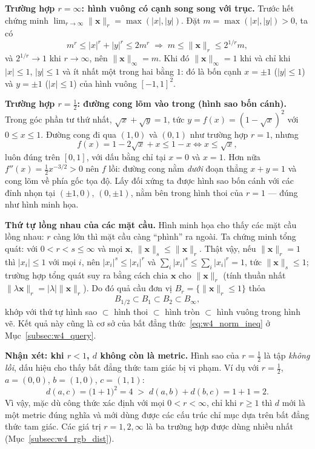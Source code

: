 \textbf{Trường hợp $r = \infty$: hình vuông có cạnh song song với trục.} Trước hết chứng minh $\lim_{r \to \infty} \|\mathbf{x}\|_r = \max(|x|, |y|)$. Đặt $m = \max(|x|, |y|) > 0$, ta có
\begin{equation}
m^r \le |x|^r + |y|^r \le 2 m^r \;\Longrightarrow\; m \le \|\mathbf{x}\|_r \le 2^{1/r} m,
\end{equation}
và $2^{1/r} \to 1$ khi $r \to \infty$, nên $\|\mathbf{x}\|_\infty = m$. Khi đó $\|\mathbf{x}\|_\infty = 1$ khi và chỉ khi $|x| \le 1$, $|y| \le 1$ và ít nhất một trong hai bằng $1$: đó là bốn cạnh $x = \pm 1$ ($|y| \le 1$) và $y = \pm 1$ ($|x| \le 1$) của hình vuông $[-1, 1]^2$.

\textbf{Trường hợp $r = \tfrac12$: đường cong lõm vào trong (hình sao bốn cánh).} Trong góc phần tư thứ nhất, $\sqrt{x} + \sqrt{y} = 1$, tức $y = f(x) = (1 - \sqrt{x})^2$ với $0 \le x \le 1$. Đường cong đi qua $(1, 0)$ và $(0, 1)$ như trường hợp $r = 1$, nhưng
\begin{equation}
f(x) = 1 - 2\sqrt{x} + x \le 1 - x \iff x \le \sqrt{x},
\end{equation}
luôn đúng trên $[0, 1]$, với dấu bằng chỉ tại $x = 0$ và $x = 1$. Hơn nữa $f''(x) = \tfrac{1}{2} x^{-3/2} > 0$ nên $f$ lồi: đường cong nằm \emph{dưới} đoạn thẳng $x + y = 1$ và cong lõm về phía gốc tọa độ. Lấy đối xứng ta được hình sao bốn cánh với các đỉnh nhọn tại $(\pm 1, 0)$, $(0, \pm 1)$, nằm bên trong hình thoi của $r = 1$ — đúng như hình minh họa.

\textbf{Thứ tự lồng nhau của các mặt cầu.} Hình minh họa cho thấy các mặt cầu lồng nhau: $r$ càng lớn thì mặt cầu càng ``phình'' ra ngoài. Ta chứng minh tổng quát: với $0 < r < s \le \infty$ và mọi $\mathbf{x}$, $\|\mathbf{x}\|_s \le \|\mathbf{x}\|_r$. Thật vậy, nếu $\|\mathbf{x}\|_r = 1$ thì $|x_i| \le 1$ với mọi $i$, nên $|x_i|^s \le |x_i|^r$ và $\sum_i |x_i|^s \le \sum_i |x_i|^r = 1$, tức $\|\mathbf{x}\|_s \le 1$; trường hợp tổng quát suy ra bằng cách chia $\mathbf{x}$ cho $\|\mathbf{x}\|_r$ (tính thuần nhất $\|\lambda \mathbf{x}\|_r = |\lambda| \|\mathbf{x}\|_r$). Do đó quả cầu đơn vị $B_r = \{\|\mathbf{x}\|_r \le 1\}$ thỏa
\begin{equation}
B_{1/2} \subset B_1 \subset B_2 \subset B_\infty,
\end{equation}
khớp với thứ tự hình sao $\subset$ hình thoi $\subset$ hình tròn $\subset$ hình vuông trong hình vẽ. Kết quả này cũng là cơ sở của bất đẳng thức~\eqref{eq:w4_norm_ineq} ở Mục~\ref{subsec:w4_query}.

\textbf{Nhận xét: khi $r < 1$, $d$ không còn là metric.} Hình sao của $r = \tfrac12$ là tập \emph{không lồi}, dấu hiệu cho thấy bất đẳng thức tam giác bị vi phạm. Ví dụ với $r = \tfrac12$, $a = (0, 0)$, $b = (1, 0)$, $c = (1, 1)$:
\begin{equation}
d(a, c) = \big(1 + 1\big)^{2} = 4 \;>\; d(a, b) + d(b, c) = 1 + 1 = 2.
\end{equation}
Vì vậy, mặc dù công thức xác định với mọi $0 < r < \infty$, chỉ khi $r \ge 1$ thì $d$ mới là một metric đúng nghĩa và mới dùng được các cấu trúc chỉ mục dựa trên bất đẳng thức tam giác. Các giá trị $r = 1, 2, \infty$ là ba trường hợp được dùng nhiều nhất (Mục~\ref{subsec:w4_rgb_dist}).

